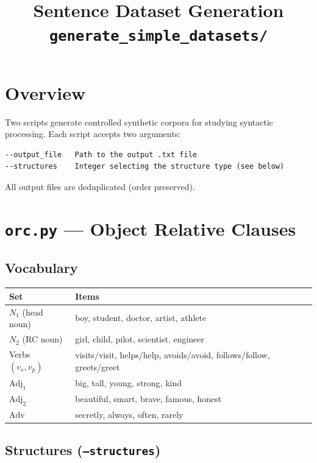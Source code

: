 \documentclass[11pt]{article}
\title{\textbf{Sentence Dataset Generation}\\
\large \texttt{generate\_simple\_datasets/}}
\author{}
\date{}
\begin{document}
\maketitle

\section*{Overview}

Two scripts generate controlled synthetic corpora for studying syntactic processing.
Each script accepts two arguments:

\begin{lstlisting}
--output_file   Path to the output .txt file
--structures    Integer selecting the structure type (see below)
\end{lstlisting}

All output files are deduplicated (order preserved).

\section*{\texttt{orc.py} --- Object Relative Clauses}

\subsection*{Vocabulary}

\begin{tabular}{lp{10cm}}
\toprule
\textbf{Set} & \textbf{Items} \\
\midrule
$N_1$ (head noun) & boy, student, doctor, artist, athlete \\
$N_2$ (RC noun)   & girl, child, pilot, scientist, engineer \\
Verbs $(v_s, v_p)$ & visits/visit, helps/help, avoids/avoid, follows/follow, greets/greet \\
$\text{Adj}_1$    & big, tall, young, strong, kind \\
$\text{Adj}_2$    & beautiful, smart, brave, famous, honest \\
$\text{Adv}$      & secretly, always, often, rarely \\
\bottomrule
\end{tabular}

\subsection*{Structures (\texttt{--structures})}
\end{document}

